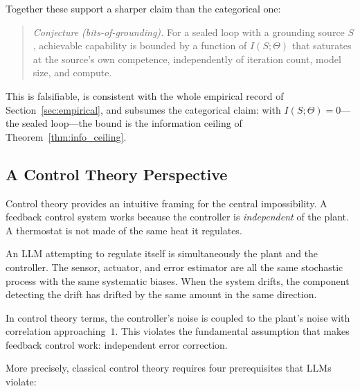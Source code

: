 \documentclass[11pt,a4paper]{article}
\begin{document}
Together these support a sharper claim than the categorical one:

\begin{quote}
\emph{Conjecture (bits-of-grounding).} For a sealed loop with a grounding source $S$, achievable capability is bounded by a function of $I(S;\Theta)$ that saturates at the source's own competence, independently of iteration count, model size, and compute.
\end{quote}

This is falsifiable, is consistent with the whole empirical record of Section~\ref{sec:empirical}, and subsumes the categorical claim: with $I(S;\Theta) = 0$---the sealed loop---the bound is the information ceiling of Theorem~\ref{thm:info_ceiling}.

\subsection{A Control Theory Perspective}
\label{sec:control}

Control theory provides an intuitive framing for the central impossibility. A feedback control system works because the controller is \emph{independent} of the plant. A thermostat is not made of the same heat it regulates.

An LLM attempting to regulate itself is simultaneously the plant and the controller. The sensor, actuator, and error estimator are all the same stochastic process with the same systematic biases. When the system drifts, the component detecting the drift has drifted by the same amount in the same direction.

In control theory terms, the controller's noise is coupled to the plant's noise with correlation approaching~$1$. This violates the fundamental assumption that makes feedback control work: independent error correction.

More precisely, classical control theory requires four prerequisites that LLMs violate:
\end{document}
